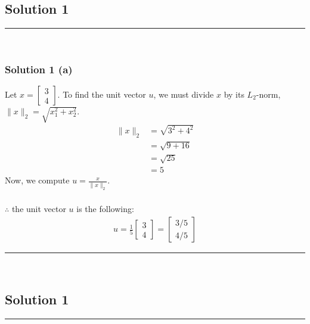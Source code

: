 \documentclass{article}
\begin{document}
\pagestyle{fancy}

\subsection*{Solution 1}
\noindent\rule{\textwidth}{0.4pt}\\
\subsubsection*{Solution 1 (a)}

Let $x = \begin{bmatrix}3 \\ 4\end{bmatrix}$.
To find the unit vector $u$, we must divide $x$ by its $L_2$-norm, $\|x\|_2 = \sqrt{x_1^2 + x_2^2}$.
\begin{align*}
    \|x\|_2 &= \sqrt{3^2 + 4^2} \\
            &= \sqrt{9 + 16} \\
            &= \sqrt{25} \\
            &= 5
\end{align*}
Now, we compute $u = \frac{x}{\|x\|_2}$.

\subsubsection*{\normalfont}{$\therefore$ the unit vector $u$ is the following:}
\begin{align*}
    u = \frac{1}{5} \begin{bmatrix}3 \\ 4\end{bmatrix} = \begin{bmatrix} 3/5 \\ 4/5 \end{bmatrix}
\end{align*}

\noindent\rule{\textwidth}{0.4pt}\\

\newpage

\subsection*{Solution 1}
\noindent\rule{\textwidth}{0.4pt}\\
\end{document}
